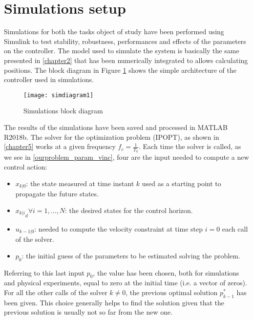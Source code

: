 \section{Simulations setup}

	Simulations for both the tasks object of study have been performed using Simulink to test stability, robustness, performances and effects of the parameters on the controller. The model used to simulate the system is basically the same presented in \ref{chapter2} that has been numerically integrated to allows calculating positions. The block diagram in Figure \ref{simdiagram1} shows the simple architecture of the controller used in simulations.

	\begin{figure}[h!]
	\begin{center} 
		\texttt{[image: simdiagram1]}
		\centering
		\label{simdiagram1}
		\caption{Simulations block diagram} 
	\end{center}
	\end{figure}

	The results of the simulations have been saved and processed in MATLAB R2018b. The solver for the optimization problem (IPOPT), as shown in \ref{chapter5} works at a given frequency $f_c=\frac{1}{T_k}$. Each time the solver is called, as we see in \ref{ourproblem_param_vinc}, four are the input needed to compute a new control action: 
	\begin{itemize}
	\item $x_{k|0}$: the state measured at time instant $k$ used as a starting point to propagate the future states.
	\item ${x_{k|i}}_d \forall i=1,\dots,N$: the desired states for the control horizon.
	\item $u_{k-1|0}$: needed to compute the velocity constraint at time step $i=0$ each call of the solver.
	\item $p_0$: the initial guess of the parameters to be estimated solving the problem. 
	\end{itemize}
	Referring to this last input $p_0$, the value has been chosen, both for simulations and physical experiments, equal to zero at the initial time (i.e. a vector of zeros). For all the other calls of the solver $k\neq0$, the previous optimal solution $p_{k-1}^*$ has been given. This choice generally helps to find the solution given that the previous solution is usually not so far from the new one.
